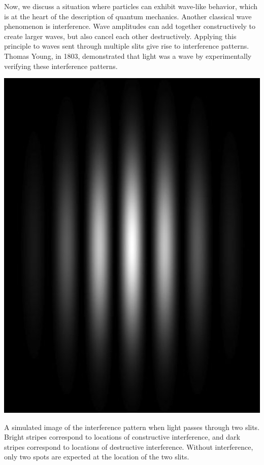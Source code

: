 Now, we discuss a situation where particles can exhibit wave-like behavior, which is at the heart of the description of quantum mechanics. Another classical wave phenomenon is interference. Wave amplitudes can add together constructively to create larger waves, but also cancel each other destructively. Applying this principle to waves sent through multiple slits give rise to interference patterns. Thomas Young, in 1803, demonstrated that light was a wave by experimentally verifying these interference patterns.
\begin{marginfigure}[-7cm]
	\includegraphics{images/double_slit_simulated.jpg}
	\caption{A simulated image of the interference pattern when light passes through two slits. Bright stripes correspond to locations of constructive interference, and dark stripes correspond to locations of destructive interference. Without interference, only two spots are expected at the location of the two slits. } 
\end{marginfigure}

